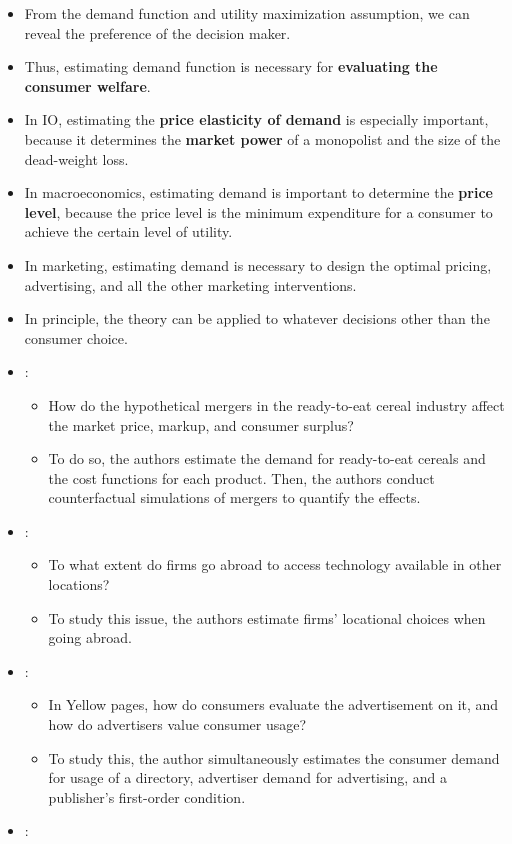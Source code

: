 \documentclass[
]{book}
\providecommand{\tightlist}{%
  \setlength{\itemsep}{0pt}\setlength{\parskip}{0pt}}
\begin{document}
\begin{itemize}
\item
  From the demand function and utility maximization assumption, we can reveal the preference of the decision maker.
\item
  Thus, estimating demand function is necessary for \textbf{evaluating the consumer welfare}.
\item
  In IO, estimating the \textbf{price elasticity of demand} is especially important, because it determines the \textbf{market power} of a monopolist and the size of the dead-weight loss.
\item
  In macroeconomics, estimating demand is important to determine the \textbf{price level}, because the price level is the minimum expenditure for a consumer to achieve the certain level of utility.
\item
  In marketing, estimating demand is necessary to design the optimal pricing, advertising, and all the other marketing interventions.
\item
  In principle, the theory can be applied to whatever decisions other than the consumer choice.
\item
  \citet{Nevo2000c}:

  \begin{itemize}
  \tightlist
  \item
    How do the hypothetical mergers in the ready-to-eat cereal industry affect the market price, markup, and consumer surplus?
  \item
    To do so, the authors estimate the demand for ready-to-eat cereals and the cost functions for each product. Then, the authors conduct counterfactual simulations of mergers to quantify the effects.
  \end{itemize}
\item
  \citet{Chung2002}:

  \begin{itemize}
  \tightlist
  \item
    To what extent do firms go abroad to access technology available in other locations?
  \item
    To study this issue, the authors estimate firms' locational choices when going abroad.
  \end{itemize}
\item
  \citet{Rysman2004}:

  \begin{itemize}
  \tightlist
  \item
    In Yellow pages, how do consumers evaluate the advertisement on it, and how do advertisers value consumer usage?
  \item
    To study this, the author simultaneously estimates the consumer demand for usage of a directory, advertiser demand for advertising, and a publisher's first-order condition.
  \end{itemize}
\item
  \citet{Gentzkow2004}:


\end{itemize}
\end{document}
